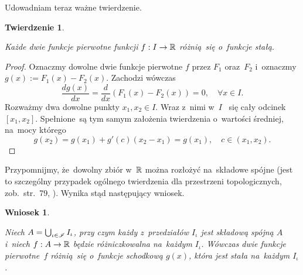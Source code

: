 \documentclass[a4paper,11pt]{article}
\newtheorem{theorem}{Twierdzenie}  %
\newtheorem{corollary}{Wniosek}
\begin{document}
Udowadniam teraz ważne twierdzenie.





\begin{theorem}
  \label{thm:FichtenholzVolII-01}

  Każde dwie funkcje pierwotne funkcji $f: I \to \mathbb{R}$ różnią~się
  o~funkcje stałą.

\end{theorem}



\begin{proof}

  Oznaczmy dowolne dwie funkcje pierwotne $f$ przez $F_{ 1 }$
  oraz~$F_{ 2 }$ i~oznaczmy $g( x ) := F_{ 1 }( x ) - F_{ 2 }( x )$.
  Zachodzi wówczas
  \begin{equation}
    \label{eq:FichtenholzVolII-06}
    \frac{ d g( x ) }{ dx } = \frac{ d }{ dx } ( F_{ 1 }( x ) - F_{ 2 }( x ) )
    = 0, \quad \forall x \in I.
  \end{equation}
  Rozważmy dwa dowolne punkty $x_{ 1 }, x_{ 2 } \in I$. Wraz z~nimi
  w~$I$ ~się cały odcinek $[ x_{ 1 }, x_{ 2 } ]$. Spełnione~są tym
  samym założenia twierdzenia o~wartości średniej, na~mocy którego
  \begin{equation}
    \label{eq:FichtenholzVolII-07}
    g( x_{ 2 } ) = g( x_{ 1 } ) + g'( c ) ( x_{ 2 } - x_{ 1 } )
    = g( x_{ 1 } ), \quad c \in ( x_{ 1 }, x_{ 2 } ).
  \end{equation}

\end{proof}





Przypomnijmy, że~dowolny zbiór w~$\mathbb{R}$ można rozłożyć na~składowe
spójne (jest to szczególny przypadek ogólnego twierdzenia dla
przestrzeni topologicznych, zob.~str.~79,
\cite{SchwartzKursAnalizyMatematycznejVolI1979}). Wynika stąd
następujący wniosek.





\begin{corollary}
  \label{cor:FichtenholzVolII-01}

  Niech $A = \bigcup_{ \iota \in \mathcal{I} } I_{ \iota }$, przy czym
  każdy z~przedziałów $I_{ \iota }$ jest składową spójną $A$ i~niech
  $f: A \to \mathbb{R}$ będzie różniczkowalna na~każdym $I_{ \iota }$.
  Wówczas dwie funkcje pierwotne~$f$ różnią~się o~funkcje schodkową
  $g( x )$, która jest stała na~każdym $I_{ \iota }$.

\end{corollary}
\end{document}
